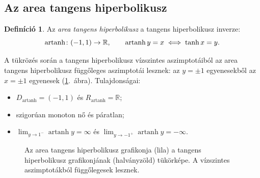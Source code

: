 \documentclass[11pt]{scrartcl}
\DeclareMathOperator{\artanh}{artanh}
\theoremstyle{definition}
\newtheorem{definition}{Definíció}
\theoremstyle{remark}
\begin{document}
\subsection{Az area tangens hiperbolikusz}

\begin{definition}
	Az \emph{area tangens hiperbolikusz} a tangens hiperbolikusz inverze:
	\[
		\artanh\colon (-1, 1) \to \mathbb{R},
		\qquad
		\artanh y = x \iff \tanh x = y\text.
	\]
\end{definition}

A tükrözés során a tangens hiperbolikusz vízszintes aszimptotáiból az area
tangens hiperbolikusz függőleges aszimptotái lesznek: az $y = \pm 1$
egyenesekből az $x = \pm 1$ egyenesek (\ref{fig:artanh}.~ábra).
Tulajdonságai:
\begin{itemize}
	\item $D_{\artanh} = (-1, 1)$ és $R_{\artanh} = \mathbb{R}$;
	\item szigorúan monoton nő és páratlan;
	\item $\displaystyle\lim_{y \to 1^-} \artanh y = \infty$ és
	      $\displaystyle\lim_{y \to -1^+} \artanh y = -\infty$.
\end{itemize}

\begin{figure}[ht]
	\centering
	\caption{Az area tangens hiperbolikusz grafikonja (lila) a tangens
		hiperbolikusz grafikonjának (halványzöld) tükörképe. A vízszintes
		aszimptotákból függőlegesek lesznek.}
	\label{fig:artanh}
\end{figure}
\end{document}
